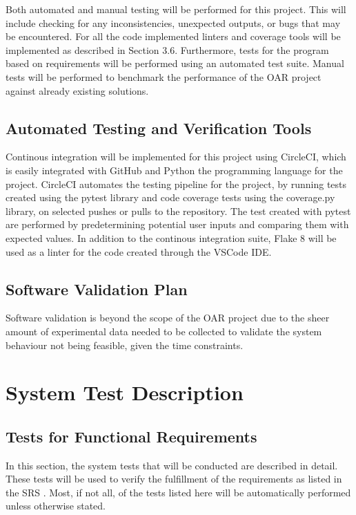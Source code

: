 \documentclass[12pt, titlepage]{article}
\begin{document}
Both automated and manual testing will be performed for this project. This will include checking for any inconsistencies,
unexpected outputs, or bugs that may be encountered.
For all the code implemented linters and coverage tools will be implemented as described in Section 3.6. Furthermore,
tests for the program based on requirements will be performed using an automated test suite. Manual tests will be 
performed to benchmark the performance of the OAR project against already existing solutions.


\subsection{Automated Testing and Verification Tools}

Continous integration will be implemented for this project using CircleCI, which 
is easily integrated with GitHub and Python the programming language for the project. CircleCI automates the testing 
pipeline for the project, by running tests created using the pytest library and code coverage tests using the coverage.py library, 
on selected pushes or pulls to the repository. The test created with pytest are performed by predetermining potential user
inputs and comparing them with expected values. In addition to the continous integration suite, Flake 8 will be used as a 
linter for the code created through the VSCode IDE.

\subsection{Software Validation Plan}

Software validation is beyond the scope of the OAR project due to the sheer amount of experimental data needed to be collected to 
validate the system behaviour not being feasible, given the time constraints.

\section{System Test Description}
	
\subsection{Tests for Functional Requirements}

In this section, the system tests that will be conducted are described in detail. These tests
will be used to verify the fulfillment of the requirements as listed in the SRS \citep{SRS}.
Most, if not all, of the tests listed here will be automatically performed unless otherwise stated.
\end{document}
